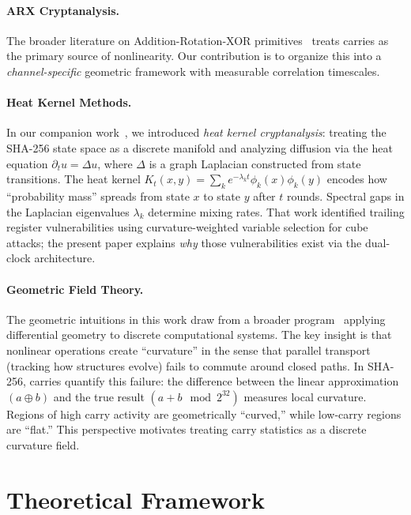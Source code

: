 \documentclass[11pt,a4paper]{article}
\theoremstyle{plain}
\theoremstyle{definition}
\theoremstyle{remark}
\begin{document}
\paragraph{ARX Cryptanalysis.}
The broader literature on Addition-Rotation-XOR primitives~\cite{arx_survey} treats carries as the primary source of nonlinearity. Our contribution is to organize this into a \emph{channel-specific} geometric framework with measurable correlation timescales.

\paragraph{Heat Kernel Methods.}
In our companion work~\cite{davis2025heatkernel}, we introduced \emph{heat kernel cryptanalysis}: treating the SHA-256 state space as a discrete manifold and analyzing diffusion via the heat equation $\partial_t u = \Delta u$, where $\Delta$ is a graph Laplacian constructed from state transitions. The heat kernel $K_t(x,y) = \sum_k e^{-\lambda_k t} \phi_k(x)\phi_k(y)$ encodes how ``probability mass'' spreads from state $x$ to state $y$ after $t$ rounds. Spectral gaps in the Laplacian eigenvalues $\lambda_k$ determine mixing rates. That work identified trailing register vulnerabilities using curvature-weighted variable selection for cube attacks; the present paper explains \emph{why} those vulnerabilities exist via the dual-clock architecture.

\paragraph{Geometric Field Theory.}
The geometric intuitions in this work draw from a broader program~\cite{davis2025semantic} applying differential geometry to discrete computational systems. The key insight is that nonlinear operations create ``curvature'' in the sense that parallel transport (tracking how structures evolve) fails to commute around closed paths. In SHA-256, carries quantify this failure: the difference between the linear approximation $(a \oplus b)$ and the true result $(a + b \mod 2^{32})$ measures local curvature. Regions of high carry activity are geometrically ``curved,'' while low-carry regions are ``flat.'' This perspective motivates treating carry statistics as a discrete curvature field.

\section{Theoretical Framework}
\end{document}
